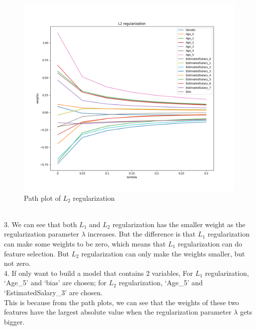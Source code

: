 \begin{figure}[htbp]
    \center
    \includegraphics[width=\textwidth]{../fig/L2.png}
    \caption{Path plot of $L_2$ regularization}
    \label{fig:L2path}
\end{figure}

\ \\

3. We can see that both $L_1$ and $L_2$ regularization has the smaller weight as the regularization parameter $\lambda$ increases.
But the difference is that $L_1$ regularization can make some weights to be zero, which means that $L_1$ regularization can do feature selection.
But $L_2$ regularization can only make the weights smaller, but not zero.\\


4. If only want to build a model that contains $2$ variables,
For $L_1$ regularization, `Age\_5' and `bias' are chosen; for $L_2$ regularization, `Age\_5' and `EstimatedSalary\_3' are chosen.\\

This is because from the path plots, we can see that the weights of these two features have the largest absolute value when the regularization parameter $\lambda$ gets bigger.